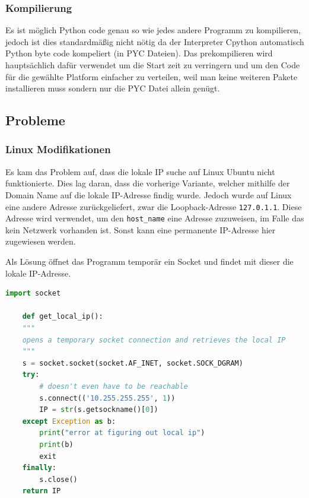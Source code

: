 \subsubsection{Kompilierung}
Es ist möglich Python code genau so wie jedes andere Programm zu kompilieren,
jedoch ist dies standardmäßig nicht nötig 
da der Interpreter Cpython automatisch Python byte code kompeliert (in PYC Dateien).
Das prekompilieren wird hauptsächlich dafür verwendet um die Start zeit zu verringern 
und um den Code für die gewählte Platform einfacher zu verteilen,
weil man keine weiteren Pakete installieren muss sondern
nur die PYC Datei allein genügt.


\subsection{Probleme}
\subsubsection{Linux Modifikationen}
Es kam das Problem auf, dass die lokale IP suche auf Linux Ubuntu nicht funktionierte.
Dies lag daran, dass die vorherige Variante, 
welcher mithilfe der Domain Name auf die lokale IP-Adresse findig wurde.
Jedoch wurde auf Linux eine andere Adresse zurückgeliefert, 
zwar die Loopback-Adresse \texttt{127.0.1.1}. 
Diese Adresse wird verwendet, um den \texttt{host\_name} eine Adresse zuzuweisen,
im Falle das kein Netzwerk vorhanden ist. 
Sonst kann eine permanente IP-Adresse hier zugewiesen werden.

Als Lösung öffnet das Programm temporär ein Socket und findet mit dieser die lokale IP-Adresse.
\begin{lstlisting}[language=python, gobble=4]
    import socket

    def get_local_ip():
    """
    opens a temporary socket connection and retrieves the local IP
    """
    s = socket.socket(socket.AF_INET, socket.SOCK_DGRAM)
    try:
        # doesn't even have to be reachable
        s.connect(('10.255.255.255', 1))
        IP = str(s.getsockname()[0])
    except Exception as b:
        print("error at figuring out local ip")
        print(b)
        exit
    finally:
        s.close()
    return IP
\end{lstlisting}

